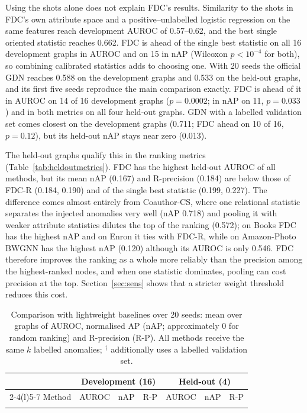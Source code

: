 \documentclass[pdflatex,sn-mathphys-ay]{sn-jnl}
\theoremstyle{plain}
\theoremstyle{remark}
\begin{document}
Using the shots alone does not explain FDC's results. Similarity to the shots in FDC's own attribute space and a positive--unlabelled logistic regression on the same features reach development AUROC of 0.57--0.62, and the best single oriented statistic reaches 0.662. FDC is ahead of the single best statistic on all 16 development graphs in AUROC and on 15 in nAP (Wilcoxon $p<10^{-4}$ for both), so combining calibrated statistics adds to choosing one. With 20 seeds the official GDN reaches 0.588 on the development graphs and 0.533 on the held-out graphs, and its first five seeds reproduce the main comparison exactly. FDC is ahead of it in AUROC on 14 of 16 development graphs ($p=0.0002$; in nAP on 11, $p=0.033$) and in both metrics on all four held-out graphs. GDN with a labelled validation set comes closest on the development graphs (0.711; FDC ahead on 10 of 16, $p=0.12$), but its held-out nAP stays near zero (0.013).

The held-out graphs qualify this in the ranking metrics (Table~\ref{tab:heldoutmetrics}). FDC has the highest held-out AUROC of all methods, but its mean nAP (0.167) and R-precision (0.184) are below those of FDC-R (0.184, 0.190) and of the single best statistic (0.199, 0.227). The difference comes almost entirely from Coauthor-CS, where one relational statistic separates the injected anomalies very well (nAP 0.718) and pooling it with weaker attribute statistics dilutes the top of the ranking (0.572); on Books FDC has the highest nAP and on Enron it ties with FDC-R, while on Amazon-Photo BWGNN has the highest nAP (0.120) although its AUROC is only 0.546. FDC therefore improves the ranking as a whole more reliably than the precision among the highest-ranked nodes, and when one statistic dominates, pooling can cost precision at the top. Section~\ref{sec:sens} shows that a stricter weight threshold reduces this cost.

\begin{table}[!ht]
\caption{Comparison with lightweight baselines over 20 seeds: mean over graphs of AUROC, normalised AP (nAP; approximately 0 for random ranking) and R-precision (R-P). All methods receive the same $k$ labelled anomalies; $^{\dagger}$ additionally uses a labelled validation set.}
\label{tab:light}
\footnotesize
\begin{tabular*}{\textwidth}{@{\extracolsep{\fill}}lcccccc@{}}
\toprule
 & \multicolumn{3}{c}{Development (16)} & \multicolumn{3}{c}{Held-out (4)} \\
\cmidrule(lr){2-4}\cmidrule(l){5-7}
Method & AUROC & nAP & R-P & AUROC & nAP & R-P \\
\midrule

\botrule
\end{tabular*}
\end{table}
\end{document}
